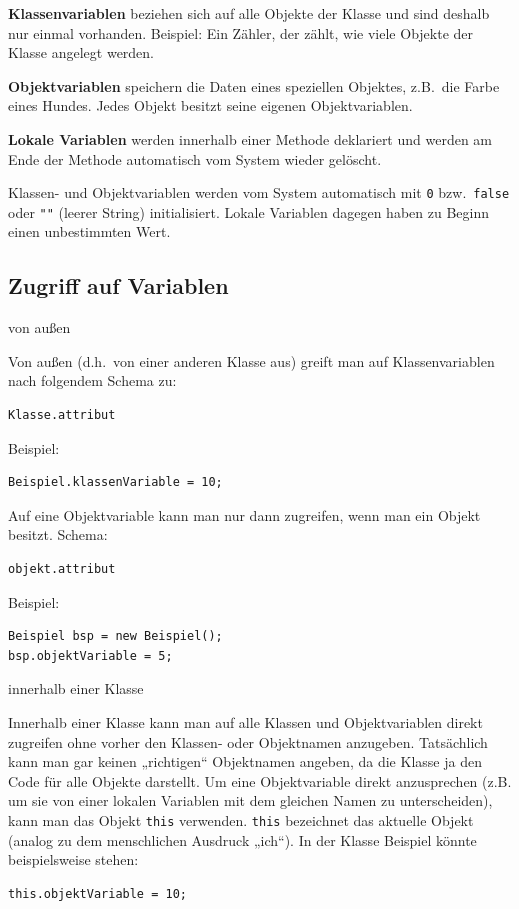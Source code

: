 \textbf{Klassenvariablen} beziehen sich auf alle Objekte der Klasse und sind
deshalb nur einmal vorhanden. Beispiel: Ein Zähler, der zählt, wie viele Objekte
der Klasse angelegt werden.

\textbf{Objektvariablen} speichern die Daten eines speziellen Objektes, z.B.\
die Farbe eines Hundes. Jedes Objekt besitzt seine eigenen Objektvariablen.

\textbf{Lokale Variablen} werden innerhalb einer Methode deklariert und werden
am Ende der Methode automatisch vom System wieder gelöscht.

Klassen- und Objektvariablen werden vom System automatisch mit \lstinline|0|
bzw.\ \lstinline|false| oder \lstinline|""| (leerer String) initialisiert.
Lokale Variablen dagegen haben zu Beginn einen unbestimmten Wert.


\subsection{Zugriff auf Variablen}

\begin{compactenum}[a)]
\item von außen

Von außen (d.h.\ von einer anderen Klasse aus) greift man auf Klassenvariablen
nach folgendem Schema zu:

\begin{lstlisting}
Klasse.attribut
\end{lstlisting}

Beispiel:

\begin{lstlisting}
Beispiel.klassenVariable = 10;
\end{lstlisting}

Auf eine Objektvariable kann man nur dann zugreifen, wenn man ein Objekt
besitzt. Schema:

\begin{lstlisting}
objekt.attribut
\end{lstlisting}

Beispiel:

\begin{lstlisting}
Beispiel bsp = new Beispiel();
bsp.objektVariable = 5;
\end{lstlisting}

\item innerhalb einer Klasse

Innerhalb einer Klasse kann man auf alle Klassen und Objektvariablen direkt
zugreifen ohne vorher den Klassen- oder Objektnamen anzugeben. Tatsächlich kann
man gar keinen „richtigen“ Objektnamen angeben, da die Klasse ja den Code für
alle Objekte darstellt. Um eine Objektvariable direkt anzusprechen (z.B. um sie
von einer lokalen Variablen mit dem gleichen Namen zu unterscheiden), kann man
das Objekt \lstinline|this| verwenden. \lstinline|this| bezeichnet das aktuelle
Objekt (analog zu dem menschlichen Ausdruck „ich“). In der Klasse Beispiel
könnte beispielsweise stehen:

\begin{lstlisting}
this.objektVariable = 10;
\end{lstlisting}
\end{compactenum}


